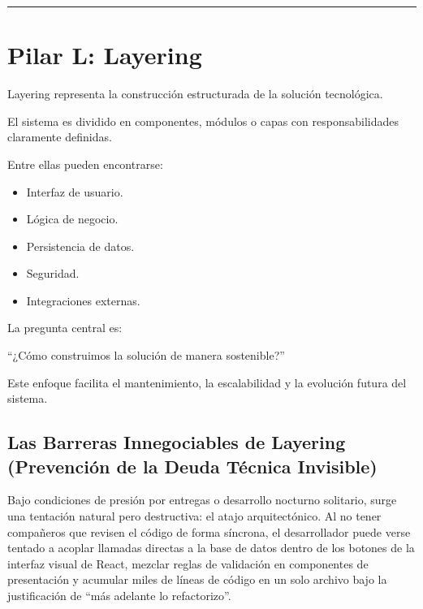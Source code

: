 \documentclass[14pt,a4paper,oneside]{extbook}
\begin{document}
\par\vspace{1.5em}\noindent\hfill\rule{0.25\textwidth}{0.6pt}\hfill\par\vspace{1.5em}

\section{Pilar L: Layering}

Layering representa la construcción estructurada de la solución tecnológica.

El sistema es dividido en componentes, módulos o capas con responsabilidades claramente definidas.

Entre ellas pueden encontrarse:

\begin{itemize}
\item Interfaz de usuario.
\item Lógica de negocio.
\item Persistencia de datos.
\item Seguridad.
\item Integraciones externas.
\end{itemize}

La pregunta central es:

\begin{keyquestion}
\enquote{¿Cómo construimos la solución de manera sostenible?}
\end{keyquestion}

Este enfoque facilita el mantenimiento, la escalabilidad y la evolución futura del sistema.

\subsection{Las Barreras Innegociables de Layering (Prevención de la Deuda Técnica Invisible)}

Bajo condiciones de presión por entregas o desarrollo nocturno solitario, surge una tentación natural pero destructiva: el atajo arquitectónico. Al no tener compañeros que revisen el código de forma síncrona, el desarrollador puede verse tentado a acoplar llamadas directas a la base de datos dentro de los botones de la interfaz visual de React, mezclar reglas de validación en componentes de presentación y acumular miles de líneas de código en un solo archivo bajo la justificación de \enquote{más adelante lo refactorizo}.
\end{document}

